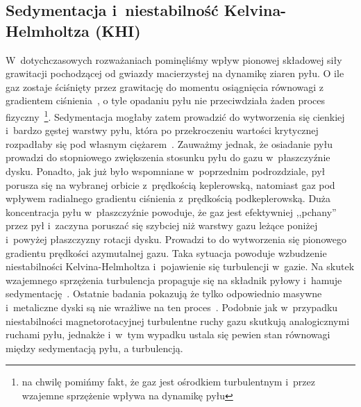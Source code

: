 \subsection{Sedymentacja i~niestabilność Kelvina-Helmholtza (KHI)}
W~dotychczasowych rozważaniach pominęliśmy wpływ pionowej składowej siły
grawitacji pochodzącej od gwiazdy macierzystej na dynamikę ziaren pyłu. O ile
gaz zostaje ściśnięty przez grawitację do momentu osiągnięcia równowagi z
gradientem ciśnienia~, o tyle opadaniu pyłu nie przeciwdziała żaden
proces fizyczny~\footnote{na chwilę pomińmy fakt, że gaz jest ośrodkiem
turbulentnym i~przez wzajemne sprzężenie wpływa na dynamikę pyłu}. Sedymentacja
mogłaby zatem prowadzić do wytworzenia się cienkiej i~bardzo gęstej warstwy
pyłu, która po przekroczeniu wartości krytycznej rozpadłaby się pod własnym
ciężarem~\citep{GW73}. Zauważmy jednak, że osiadanie pyłu prowadzi do
stopniowego zwiększenia stosunku pyłu do gazu w~płaszczyźnie dysku. Ponadto, jak
już było wspomniane w~poprzednim podrozdziale, pył porusza się na wybranej
orbicie z~prędkością keplerowską, natomiast gaz pod wpływem radialnego gradientu
ciśnienia z~prędkością podkeplerowską. Duża koncentracja pyłu w~płaszczyźnie
powoduje, że gaz jest efektywniej ,,pchany'' przez pył i~zaczyna poruszać się
szybciej niż warstwy gazu leżące poniżej i~powyżej płaszczyzny rotacji dysku.
Prowadzi to do wytworzenia się pionowego gradientu prędkości azymutalnej gazu.
Taka sytuacja powoduje wzbudzenie niestabilności Kelvina-Helmholtza i~pojawienie
się turbulencji w~gazie.  Na skutek wzajemnego sprzężenia turbulencja propaguje
się na składnik pyłowy i~hamuje sedymentację~\cite{JHK06}.  Ostatnie badania
pokazują że tylko odpowiednio masywne i~metaliczne dyski są nie wrażliwe na ten
proces~\citep{L10}. Podobnie jak w~przypadku niestabilności magnetorotacyjnej
turbulentne ruchy gazu skutkują analogicznymi ruchami pyłu, jednakże i~w~tym
wypadku ustala się pewien stan równowagi między sedymentacją pyłu, a
turbulencją. 

